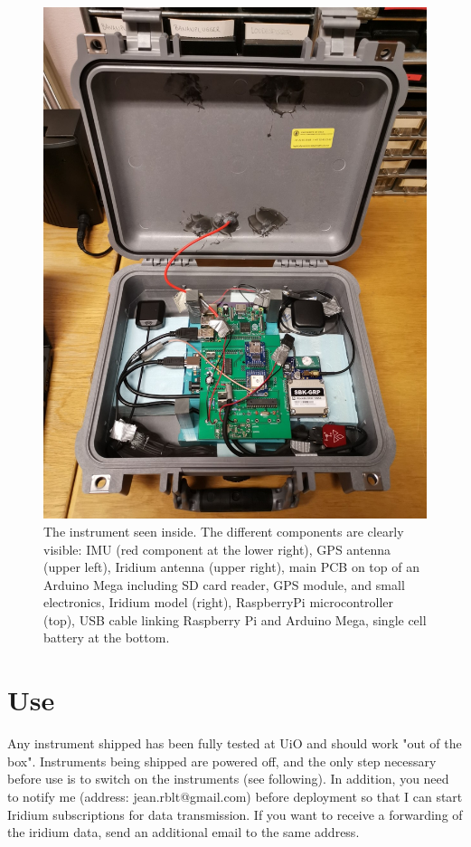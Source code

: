 \documentclass[pdftex,a4paper,12pt,twocolumn,fleqn,captions=tableheading]{scrartcl}
\begin{document}
  \begin{figure}
  \begin{center}
  \includegraphics[width=.8\textwidth]{Figures/IMG_20200616_161730}
  \caption{\label{FromInside} The instrument seen inside. The different components are clearly visible: IMU (red component at the lower right), GPS antenna (upper left), Iridium antenna (upper right), main PCB on top of an Arduino Mega including SD card reader, GPS module, and small electronics, Iridium model (right), RaspberryPi microcontroller (top), USB cable linking Raspberry Pi and Arduino Mega, single cell battery at the bottom.}
  \end{center}
  \end{figure}

\section{Use}

Any instrument shipped has been fully tested at UiO and should work "out of the box". Instruments being shipped are powered off, and the only step necessary before use is to switch on the instruments (see following). In addition, you need to notify me (address: jean.rblt@gmail.com) before deployment so that I can start Iridium subscriptions for data transmission. If you want to receive a forwarding of the iridium data, send an additional email to the same address. ~\\
\end{document}
